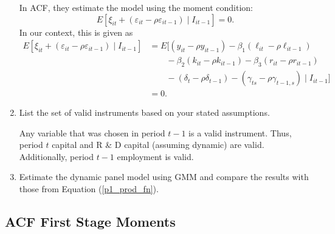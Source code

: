 \documentclass{article}
\begin{document}
\begin{enumerate}
\begin{answer}

In ACF, they estimate the model using the moment condition: 
\[
E[\xi_{it} + (\varepsilon_{it} - \rho \varepsilon_{it-1}) \mid I_{it-1}] =0.
\]
In our context, this is given as 
\begin{align*}
E[\xi_{it} + (\varepsilon_{it} - \rho \varepsilon_{it-1}) \mid I_{it-1}] &= 
E[(y_{it} - \rho  y_{it-1}) - \beta_1 (\ell_{it} - \rho \ell_{it-1}) \\
&\quad \quad - \beta_2 (k_{it} - \rho k_{it-1}) - \beta_3 (r_{it}  - \rho r_{it-1}) \\
&\quad \quad - (\delta_t - \rho \delta_{t-1})-(\gamma_{ts} - \rho \gamma_{t-1, s})
\mid I_{it-1}] \\
&= 0.
\end{align*}


\end{answer}




\item List the set of valid instruments based on your stated assumptions.


\begin{answer}

Any variable that was chosen in period $t-1$ is a valid instrument. Thus, period $t$ capital and R \& D capital (assuming dynamic) are valid. Additionally, period $t-1$ employment is valid. 

\end{answer}


\item Estimate the dynamic panel model using GMM and compare the results with
those from Equation (\ref{p1_prod_fn}).


\end{enumerate}


\subsection{ACF First Stage Moments}
\end{document}
